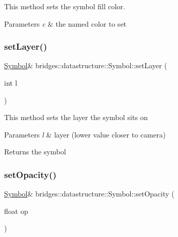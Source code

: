 This method sets the symbol fill color. 


\begin{DoxyParams}{Parameters}
{\em c} & the named color to set \\
\hline
\end{DoxyParams}
\mbox{\label{classbridges_1_1datastructure_1_1_symbol_a0b0489bf812271875be5f0f10be568a1}} 
\subsubsection{\texorpdfstring{set\+Layer()}{setLayer()}}
{\footnotesize\ttfamily \hyperlink{classbridges_1_1datastructure_1_1_symbol}{Symbol}\& bridges\+::datastructure\+::\+Symbol\+::set\+Layer (\begin{DoxyParamCaption}\item[{int}]{l }\end{DoxyParamCaption})\hspace{0.3cm}{\ttfamily [inline]}}

This method sets the layer the symbol sits on


\begin{DoxyParams}{Parameters}
{\em l} & layer (lower value closer to camera) \\
\hline
\end{DoxyParams}
\begin{DoxyReturn}{Returns}
the symbol 
\end{DoxyReturn}
\mbox{\label{classbridges_1_1datastructure_1_1_symbol_a5cecb1e3a9e3b95307f94f6d2a4383a2}} 
\subsubsection{\texorpdfstring{set\+Opacity()}{setOpacity()}}
{\footnotesize\ttfamily \hyperlink{classbridges_1_1datastructure_1_1_symbol}{Symbol}\& bridges\+::datastructure\+::\+Symbol\+::set\+Opacity (\begin{DoxyParamCaption}\item[{float}]{op }\end{DoxyParamCaption})\hspace{0.3cm}{\ttfamily [inline]}}



